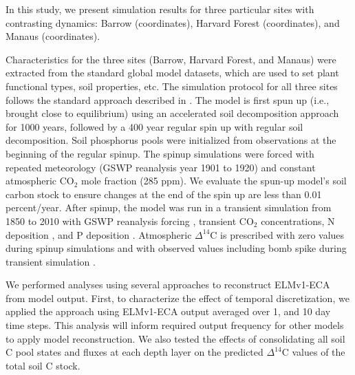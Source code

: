 \documentclass[11pt,a4paper]{article}
\newcommand{\red}[1]{\textcolor{red}{#1}}
\newcommand{\gray}[1]{\textcolor{gray}{#1}}
\begin{document}
  In this study, we present simulation results for three particular sites with contrasting dynamics: Barrow (coordinates), Harvard Forest (coordinates), and Manaus (coordinates). 
    
    Characteristics for the three sites (Barrow, Harvard Forest, and Manaus) were extracted from the standard global model datasets, which are used to set plant functional types, soil properties, etc. The simulation protocol for all three sites follows the standard approach described in \citet{Oleson2010}. The model is first spun up (i.e., brought close to equilibrium) using an accelerated soil decomposition approach \citep{Koven2013} for 1000 years, followed by a 400 year regular spin up with regular soil decomposition. Soil phosphorus pools were initialized from observations \citep{Yang2013} at the beginning of the regular spinup. The spinup simulations were forced with repeated meteorology (GSWP reanalysis \citep{Dirmeyer2006} year 1901 to 1920) and constant atmospheric CO$_2$ mole fraction (285 ppm). We evaluate the spun-up model's soil carbon stock to ensure changes at the end of the spin up are less than 0.01 percent/year. After spinup, the model was run in a transient simulation from 1850 to 2010 with GSWP reanalysis forcing \citep{Dirmeyer2006}, transient CO$_2$ concentrations, N deposition \citep{Lamarque2005}, and P deposition \citep{Mahowald2008}. Atmospheric   $\Delta^{14}$C  is prescribed with zero values during spinup simulations and with observed values including bomb spike during transient simulation \citep{Levin2010}.
    
    
    
    We performed analyses using several approaches to reconstruct ELMv1-ECA from model output. First, to characterize the effect of temporal discretization, we applied the approach using ELMv1-ECA output averaged over 1, and 10 day time steps. 
    This analysis will inform required output frequency for other models to apply model reconstruction. We also tested the effects of consolidating all soil C pool states and fluxes at each depth layer on the predicted $\Delta^{14}$C values of the total soil C stock. 
\end{document}
